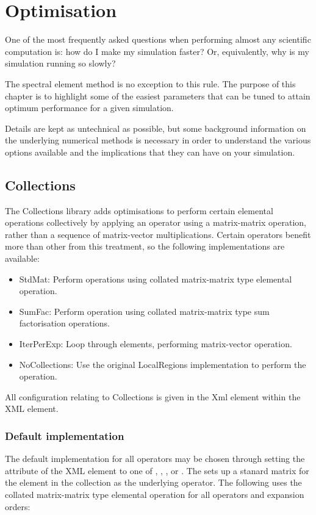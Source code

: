 \chapter{Optimisation}

One of the most frequently asked questions when performing almost any scientific
computation is: how do I make my simulation faster? Or, equivalently, why is my
simulation running so slowly?

The spectral element method is no exception to this rule. The purpose of this
chapter is to highlight some of the easiest parameters that can be tuned to
attain optimum performance for a given simulation.

Details are kept as untechnical as possible, but some background information on
the underlying numerical methods is necessary in order to understand the various
options available and the implications that they can have on your simulation.

\section{Collections}
The Collections library adds optimisations to perform certain elemental
operations collectively by applying an operator using a matrix-matrix operation,
rather than a sequence of matrix-vector multiplications. Certain operators
benefit more than other from this treatment, so the following implementations
are available:
\begin{itemize}
    \item StdMat: Perform operations using collated matrix-matrix type elemental
        operation.
    \item SumFac: Perform operation using collated matrix-matrix type sum
        factorisation operations.
    \item IterPerExp: Loop through elements, performing matrix-vector operation.
    \item NoCollections: Use the original LocalRegions implementation to
        perform the operation.
\end{itemize}
All configuration relating to Collections is given in the 
Xml element within the  XML element.

\subsection{Default implementation}
The default implementation for all operators may be chosen through
setting the  attribute of the  XML
element to one of , , ,
 or . The  sets up
a stanard matrix for the element in the collection as the underlying
operator. The following uses the collated matrix-matrix type elemental
operation for all operators and expansion orders:

